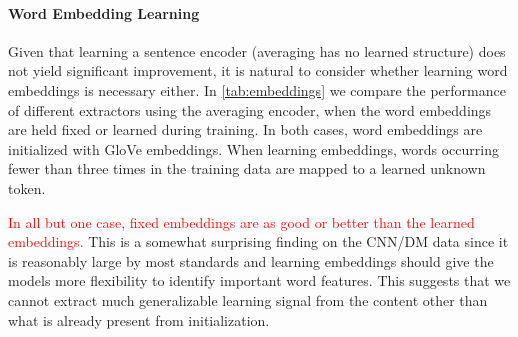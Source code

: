 




\paragraph{Word Embedding Learning}
 Given that learning a sentence encoder (averaging has no learned structure)
 does not yield significant improvement, it is natural to consider whether
 learning word embeddings is necessary either. 
 In \autoref{tab:embeddings} we compare the performance of different extractors
 using the averaging encoder, when the word embeddings are held fixed or 
 learned during training. In both cases, word embeddings are initialized with
 GloVe embeddings.
 When learning embeddings, words occurring 
 fewer than three times in the training data are mapped to a learned unknown
 token.
 
 \textcolor{red}{In all but one case,
fixed embeddings are as good or better than the learned embeddings.}
This is a somewhat surprising finding on the CNN/DM data since it is reasonably
large by most standards and learning embeddings should give the models more
flexibility to identify important word features. 
This suggests that we cannot extract much generalizable learning signal 
from the content other than what is already present from initialization. 

